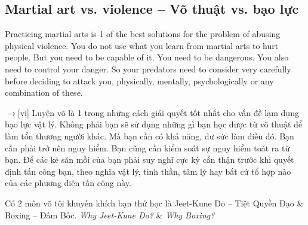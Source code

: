 \documentclass[12pt,twoside]{book}
\begin{document}
\subsection{Martial art vs. violence -- Võ thuật vs. bạo lực}
Practicing martial arts is 1 of the best solutions for the problem of abusing physical violence. You do not use what you learn from martial arts to hurt people. But you need to be capable of it. You need to be dangerous. You also need to control your danger. So your predators need to consider very carefully before deciding to attack you, physically, mentally, psychologically or any combination of these.

{\sf[en]$\to$[vi]} Luyện võ là 1 trong những cách giải quyết tốt nhất cho vấn đề lạm dụng bạo lực vật lý. Không phải bạn sẽ sử dụng những gì bạn học được từ võ thuật để làm tổn thương người khác. Mà bạn cần có khả năng, dư sức làm điều đó. Bạn cần phải trở nên nguy hiểm. Bạn cũng cần kiểm soát sự nguy hiểm toát ra từ bạn. Để các kẻ săn mồi của bạn phải suy nghĩ cực kỳ cẩn thận trước khi quyết định tấn công bạn, theo nghĩa vật lý, tinh thần, tâm lý hay bất cứ tổ hợp nào của các phương diện tấn công này.

Có 2 môn võ tôi khuyến khích bạn thử học là Jeet-Kune Do -- Tiệt Quyền Đạo \& Boxing -- Đấm Bốc. {\it Why Jeet-Kune Do?} \& {\it Why Boxing?}

\end{document}
